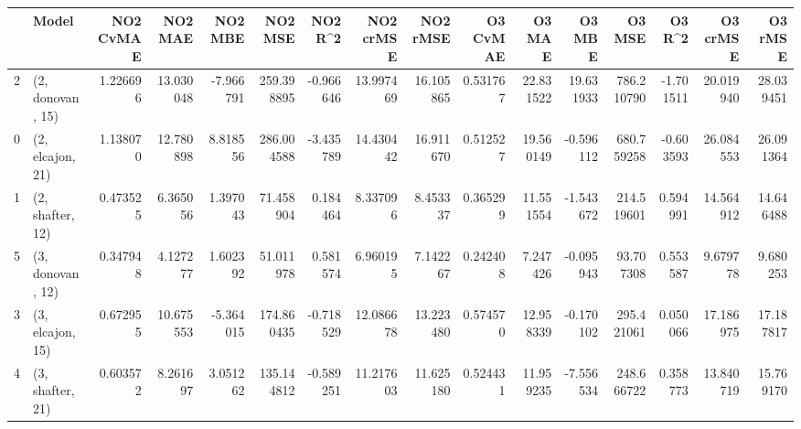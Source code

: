 \begin{tabular}{llrrrrrrrrrrrrrr}
\toprule
{} &             Model &  NO2 CvMAE &    NO2 MAE &   NO2 MBE &     NO2 MSE &   NO2 R\textasciicircum2 &  NO2 crMSE &   NO2 rMSE &  O3 CvMAE &     O3 MAE &     O3 MBE &      O3 MSE &    O3 R\textasciicircum2 &   O3 crMSE &    O3 rMSE \\
\midrule
2 &  (2, donovan, 15) &   1.226696 &  13.030048 & -7.966791 &  259.398895 & -0.966646 &  13.997469 &  16.105865 &  0.531767 &  22.831522 &  19.631933 &  786.210790 & -1.701511 &  20.019940 &  28.039451 \\
0 &  (2, elcajon, 21) &   1.138070 &  12.780898 &  8.818556 &  286.004588 & -3.435789 &  14.430442 &  16.911670 &  0.512527 &  19.560149 &  -0.596112 &  680.759258 & -0.603593 &  26.084553 &  26.091364 \\
1 &  (2, shafter, 12) &   0.473525 &   6.365056 &  1.397043 &   71.458904 &  0.184464 &   8.337096 &   8.453337 &  0.365299 &  11.551554 &  -1.543672 &  214.519601 &  0.594991 &  14.564912 &  14.646488 \\
5 &  (3, donovan, 12) &   0.347948 &   4.127277 &  1.602392 &   51.011978 &  0.581574 &   6.960195 &   7.142267 &  0.242408 &   7.247426 &  -0.095943 &   93.707308 &  0.553587 &   9.679778 &   9.680253 \\
3 &  (3, elcajon, 15) &   0.672955 &  10.675553 & -5.364015 &  174.860435 & -0.718529 &  12.086678 &  13.223480 &  0.574570 &  12.958339 &  -0.170102 &  295.421061 &  0.050066 &  17.186975 &  17.187817 \\
4 &  (3, shafter, 21) &   0.603572 &   8.261697 &  3.051262 &  135.144812 & -0.589251 &  11.217603 &  11.625180 &  0.524431 &  11.959235 &  -7.556534 &  248.666722 &  0.358773 &  13.840719 &  15.769170 \\
\bottomrule
\end{tabular}
